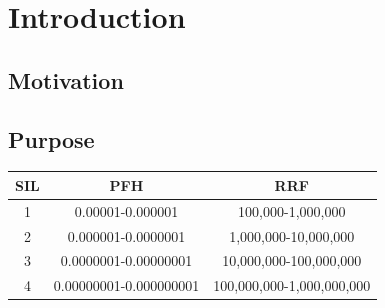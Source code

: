 \documentclass[11pt]{report}
\begin{document}

%

\newpage
\tableofcontents  

%




\listoffigures 


\pagestyle{headings}

\chapter{Introduction}
\label{kap:Einleitung} 

\section{Motivation}



\section{Purpose}




\begin{center}
\begin{tabular}{|c||c|c|}
\hline 
SIL & 	PFH &		RRF\\ \hline
1 &	0.00001-0.000001 &	100,000-1,000,000\\
2 &	0.000001-0.0000001 &		1,000,000-10,000,000\\
3 &	0.0000001-0.00000001 		& 10,000,000-100,000,000\\
4 &	0.00000001-0.000000001 &	100,000,000-1,000,000,000\\
\hline
\end{tabular}
\end{center}
\end{document}
